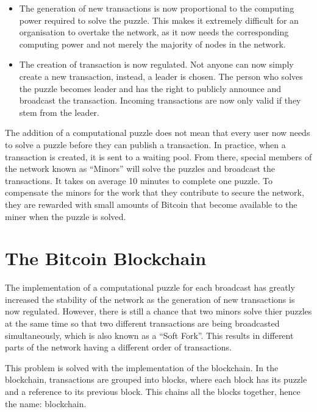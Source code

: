 \documentclass[a4paper, 12pt]{report}
\begin{document}
\begin{itemize}
	\item The generation of new transactions is now proportional to the computing power required to solve the puzzle. This makes it extremely difficult for an organisation to overtake the network, as it now needs the corresponding computing power and not merely the majority of nodes in the network.
	\item The creation of transaction is now regulated. Not anyone can now simply create a new transaction, instead, a leader is chosen. The person who solves the puzzle becomes leader and has the right to publicly announce and broadcast the transaction. Incoming transactions are now only valid if they stem from the leader.
\end{itemize}

\par The addition of a computational puzzle does not mean that every user now needs to solve a puzzle before they can publish a transaction. In practice, when a transaction is created, it is sent to a waiting pool. From there, special members of the network known as “Minors” will solve the puzzles and broadcast the transactions. It takes on average 10 minutes to complete one puzzle. To compensate the minors for the work that they contribute to secure the network, they are rewarded with small amounts of Bitcoin that become available to the miner when the puzzle is solved.

\section{The Bitcoin Blockchain}

\par The implementation of a computational puzzle for each broadcast has greatly increased the stability of the network as the generation of new transactions is now regulated. However, there is still a chance that two minors solve thier puzzles at the same time so that two different transactions are being broadcasted simultaneously, which is also known as a “Soft Fork”. This results in different parts of the network having a different order of transactions.

\par This problem is solved with the implementation of the blockchain. In the blockchain, transactions are grouped into blocks, where each block has its puzzle and a reference to its previous block. This chains all the blocks together, hence the name: blockchain.
\end{document}
